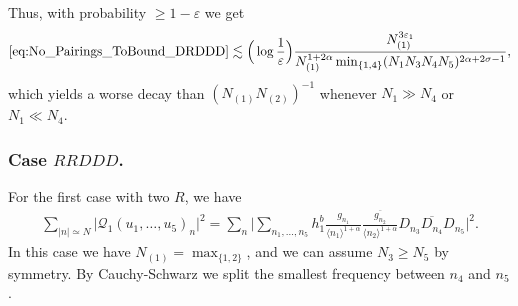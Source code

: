\documentclass[11pt, xcolor = dvipsnames,reqno
]{amsart}
\theoremstyle{definition}
\theoremstyle{remark}
\begin{document}
Thus, with probability $\geq 1 - \varepsilon$ we get
\begin{align}
    \eqref{eq:No_Pairings_ToBound_DRDDD}
    \lesssim 
    \Big( \log \frac{1}{\varepsilon} \Big) 
    \frac{ N_{(1)}^{3\varepsilon_1}}{N_{(1)}^{1+2\alpha} \operatorname{min}_{\{1,4\}}  (N_1N_3N_4N_5)^{2 \alpha + 2\sigma - 1}},
\end{align}
which yields a worse decay than $(N_{(1)} N_{(2)})^{-1}$ whenever $N_1 \gg N_4$ or $N_1 \ll N_4$.




\subsubsection{Case $RRDDD$.}
For the first case with two $R$, we have
\begin{align}\label{eq:No_Pairings_ToBound_RRDDD}
    \sum_{|n| \simeq N}  \big| \mathcal{Q}_1(u_1, \ldots, u_5)_n \big|^2
    = 
    \sum_n \bigg| \sum_{n_1, \ldots, n_5 } h^b_1 \frac{g_{n_1}}{\langle n_1 \rangle^{1+\alpha}} \frac{\overline{g_{n_2}}}{\langle n_2 \rangle^{1+\alpha}} D_{n_3} \overline{D_{n_4}} D_{n_5} \bigg|^2.
\end{align}
In this case we have $N_{(1)} = \operatorname{max}_{\{1,2\}}$, 
and we can assume $N_3 \geq N_5$ by symmetry. By Cauchy-Schwarz we split the smallest frequency between $n_4$ and $n_5$.  
\end{document}
